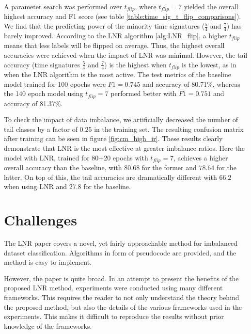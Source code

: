 \documentclass{article}
\begin{document}
A  parameter search was performed over $t_{flip}$, where $t_{flip} = 7$ yielded the overall highest accuracy and F1 score (see table \ref{table:time_sig_t_flip_comparisons}). We find that the predicting power of the minority time signatures ($\frac{5}{4}$ and $\frac{7}{4}$) has barely improved. According to the LNR algorithm \ref{alg:LNR_flip}, a higher $t_{flip}$ means that less labels will be flipped on average. Thus, the highest overall accuracies were achieved when the impact of LNR was minimal. However, the tail accuracy (time signatures $\frac{5}{4}$ and $\frac{7}{4}$) is the highest when $t_{flip}$ is the lowest, as in when the LNR algorithm is the most active. The test metrics of the baseline model trained for 100 epochs were $F1=0.745$ and accuracy of 80.71\%, whereas the 140 epoch model using $t_{flip} = 7$ performed better with $F1=0.751$ and accuracy of 81.37\%.

To check the impact of data imbalance, we artificially decreased the number of tail classes by a factor of $0.25$ in the training set. The resulting confusion matrix after training can be seen in figure \ref{fig:cm_high_ir}. These results clearly demonstrate that LNR is the most effective at greater imbalance ratios. Here the model with LNR, trained for 80+20 epochs with $t_{flip}=7$, achieves a higher overall accuracy than the baseline, with $80.68$ for the former and $78.64$ for the latter. On top of this, the tail accuracies are dramatically different with $66.2$ when using LNR and $27.8$ for the baseline. 

\section{Challenges}

The LNR paper covers a novel, yet fairly approachable method for imbalanced dataset classification. Algorithms in form of pseudocode are provided, and the method is easy to implement.

However, the paper is quite broad. In an attempt to present the benefits of the proposed LNR method, experiments were conducted using many different frameworks. This requires the reader to not only understand the theory behind the proposed method, but also the details of the various frameworks used in the experiments. This makes it difficult to reproduce the results without prior knowledge of the frameworks.
\end{document}
